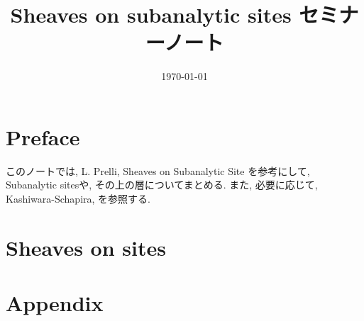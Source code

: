\documentclass[nomag*,a4paper,leqno,uplatex]{jsarticle}
\title{\vspace{-2.5em}Sheaves on subanalytic sites セミナーノート\vspace{-1em}}
\date{\vspace{-1em}\today\vspace{-1.5em}}
\numberwithin{thm}{subsection}
\numberwithin{equation}{subsection}
\begin{document}
\maketitle
\tableofcontents
\addtocounter{section}{-1}
\section{Preface}
このノートでは,
L. Prelli,
Sheaves on Subanalytic Site \cite{book:Prelli}
を参考にして,
Subanalytic sitesや,
その上の層についてまとめる.
また, 必要に応じて,
Kashiwara-Schapira\cite{book:KS_sh}, \cite{book:KS_cat}
を参照する.

\section{Sheaves on sites}



\section{Appendix}


\end{document}
